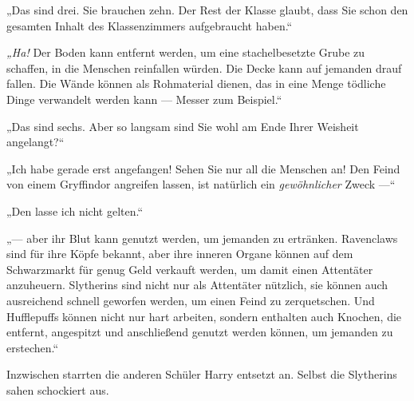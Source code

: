 „Das sind drei. Sie brauchen zehn. Der Rest der Klasse glaubt, dass Sie schon den gesamten Inhalt des Klassenzimmers aufgebraucht haben.“

\emph{„Ha!} Der Boden kann entfernt werden, um eine stachelbesetzte Grube zu schaffen, in die Menschen reinfallen würden. Die Decke kann auf jemanden drauf fallen. Die Wände können als Rohmaterial dienen, das in eine Menge tödliche Dinge verwandelt werden kann — Messer zum Beispiel.“

„Das sind sechs. Aber so langsam sind Sie wohl am Ende Ihrer Weisheit angelangt?“

„Ich habe gerade erst angefangen! Sehen Sie nur all die Menschen an! Den Feind von einem Gryffindor angreifen lassen, ist natürlich ein \emph{gewöhnlicher} Zweck —“

„Den lasse ich nicht gelten.“

„— aber ihr Blut kann genutzt werden, um jemanden zu ertränken. Ravenclaws sind für ihre Köpfe bekannt, aber ihre inneren Organe können auf dem Schwarzmarkt für genug Geld verkauft werden, um damit einen Attentäter anzuheuern. Slytherins sind nicht nur als Attentäter nützlich, sie können auch ausreichend schnell geworfen werden, um einen Feind zu zerquetschen. Und Hufflepuffs können nicht nur hart arbeiten, sondern enthalten auch Knochen, die entfernt, angespitzt und anschließend genutzt werden können, um jemanden zu erstechen.“

Inzwischen starrten die anderen Schüler Harry entsetzt an. Selbst die Slytherins sahen schockiert aus.

